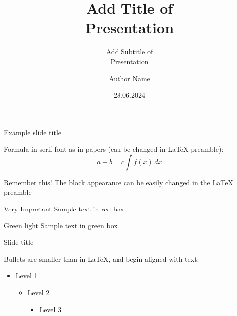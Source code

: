 \documentclass[aspectratio=169,t]{beamer}  %
\title[Short title]{Add Title of\\Presentation}
\subtitle{Add Subtitle of\\Presentation}
\author[Short author]{Author Name}
\date{28.06.2024}
\institute{Location}
\begin{document}
\begin{frame}[plain,c] %
 \titlepage
\end{frame}


\begin{frame}{Example slide title}

Formula in serif-font as in papers (can be changed in LaTeX preamble):
\begin{equation}
    a + b = c \int f(x)\,dx
\end{equation}

\begin{block}{Remember this!}
The block appearance can be easily changed in the LaTeX preamble
\end{block}

\begin{alertblock}{Very Important}
Sample text in red box
\end{alertblock}

\begin{examples}{Green light}
Sample text in green box.
\end{examples}

\end{frame}


\begin{frame}{Slide title}

Bullets are smaller than in LaTeX, and begin aligned with text: 
\begin{itemize}
 \item Level 1
 \begin{itemize}
     \item Level 2
     \begin{itemize}
          \item Level 3
      \end{itemize}    
 \end{itemize}     
\end{itemize}

\end{frame}
\end{document}
